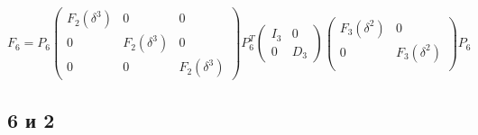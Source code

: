 \[
    F_6
    = P_6
    \begin{pmatrix}
        F_2(\delta^3) & 0             & 0             \\
        0             & F_2(\delta^3) & 0             \\
        0             & 0             & F_2(\delta^3)
    \end{pmatrix}
    P_6^T
    \begin{pmatrix}
        I_3 & 0   \\
        0   & D_3
    \end{pmatrix}
    \begin{pmatrix}
        F_3(\delta^2) & 0             \\
        0             & F_3(\delta^2) \\
    \end{pmatrix}
    P_6
\]

\subsection{6 и 2}

